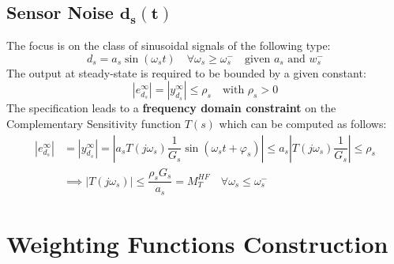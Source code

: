 \documentclass[a4paper,10pt,titlepage]{article}
\numberwithin{equation}{subsection}
\begin{document}
	\subsection{Sensor Noise $\bm{d_s(t)}$}
	The focus is on the class of sinusoidal signals of the following type:
	\begin{equation}
		d_s = a_s\sin(\omega_st) \quad \forall\omega_s\geq\omega_s^- \quad \text{given } a_s \text{ and } w_s^-
	\end{equation}
	The output at steady-state is required to be bounded by a given constant:
	\begin{equation}
		\left| e_{d_s}^\infty \right| = \left| y_{d_s}^\infty \right| \leq \rho_s \quad \text{with } \rho_s>0
	\end{equation}
	The specification leads to a \textbf{frequency domain constraint} on the Complementary Sensitivity function $T(s)$ which can be computed as follows:
	\begin{align}
		\left| e_{d_s}^\infty \right| &= \left| y_{d_s}^\infty \right| = \left| a_sT(j\omega_s)\dfrac{1}{G_s}\sin(\omega_st+\varphi_s) \right| \leq a_s\left|T(j\omega_s)\dfrac{1}{G_s}\right| \leq \rho_s \nonumber \\
		&\implies \left|T(j\omega_s)\right| \leq \dfrac{\rho_sG_s}{a_s} = M_T^{HF} \quad \forall\omega_s \leq \omega_s^-
	\end{align}
	
	
	\section{Weighting Functions Construction}
\end{document}
